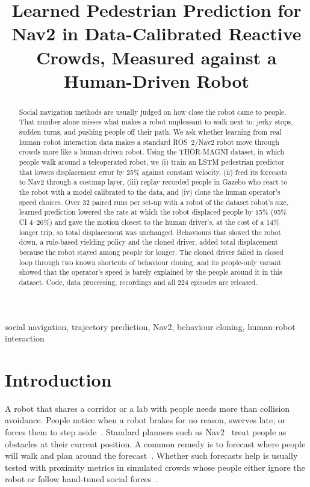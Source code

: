 \documentclass[conference]{IEEEtran}
\begin{document}
\title{Learned Pedestrian Prediction for Nav2 in Data-Calibrated Reactive Crowds, Measured against a Human-Driven Robot}

\author{
}

\maketitle

\begin{abstract}
Social navigation methods are usually judged on how close the robot came to people. That number alone misses what makes a robot unpleasant to walk next to: jerky stops, sudden turns, and pushing people off their path. We ask whether learning from real human--robot interaction data makes a standard ROS~2/Nav2 robot move through crowds more like a human-driven robot. Using the TH\"OR-MAGNI dataset, in which people walk around a teleoperated robot, we (i) train an LSTM pedestrian predictor that lowers displacement error by 25\% against constant velocity, (ii) feed its forecasts to Nav2 through a costmap layer, (iii) replay recorded people in Gazebo who react to the robot with a model calibrated to the data, and (iv) clone the human operator's speed choices. Over 32 paired runs per set-up with a robot of the dataset robot's size, learned prediction lowered the rate at which the robot displaced people by 15\% (95\% CI 4--26\%) and gave the motion closest to the human driver's, at the cost of a 14\% longer trip, so total displacement was unchanged. Behaviours that slowed the robot down, a rule-based yielding policy and the cloned driver, added total displacement because the robot stayed among people for longer. The cloned driver failed in closed loop through two known shortcuts of behaviour cloning, and its people-only variant showed that the operator's speed is barely explained by the people around it in this dataset. Code, data processing, recordings and all 224 episodes are released.
\end{abstract}

\begin{IEEEkeywords}
social navigation, trajectory prediction, Nav2, behaviour cloning, human-robot interaction
\end{IEEEkeywords}

\section{Introduction}
A robot that shares a corridor or a lab with people needs more than collision avoidance. People notice when a robot brakes for no reason, swerves late, or forces them to step aside~\cite{kruse2013survey,mavrogiannis2023core}. Standard planners such as Nav2~\cite{macenski2020nav2} treat people as obstacles at their current position. A common remedy is to forecast where people will walk and plan around the forecast~\cite{rudenko2020survey,trautman2010unfreezing}. Whether such forecasts help is usually tested with proximity metrics in simulated crowds whose people either ignore the robot or follow hand-tuned social forces~\cite{helbing1995social,biswas2022socnavbench}.
\end{document}
